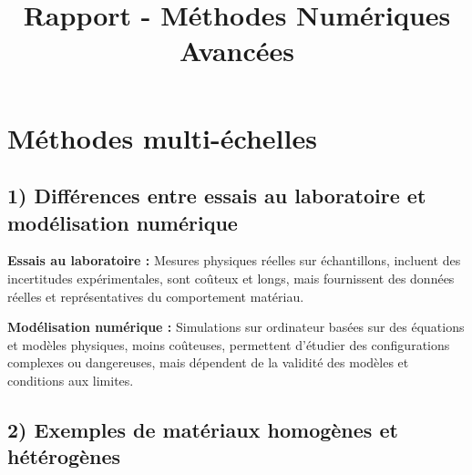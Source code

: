 \documentclass{rapportECL}
\title{Rapport - Méthodes Numériques Avancées} %
\begin{document}





        
\fairemarges %
\fairepagedegarde %
\tabledematieres %

\section{Méthodes multi-échelles}

\subsection*{1) Différences entre essais au laboratoire et modélisation numérique}

\begin{tcolorbox}[colback=white!5!white,colframe=blue!75!black]
\textbf{Essais au laboratoire :} Mesures physiques réelles sur échantillons, incluent des incertitudes expérimentales, sont coûteux et longs, mais fournissent des données réelles et représentatives du comportement matériau.

\textbf{Modélisation numérique :} Simulations sur ordinateur basées sur des équations et modèles physiques, moins coûteuses, permettent d'étudier des configurations complexes ou dangereuses, mais dépendent de la validité des modèles et conditions aux limites.
\end{tcolorbox}

\subsection*{2) Exemples de matériaux homogènes et hétérogènes}
\end{document}
